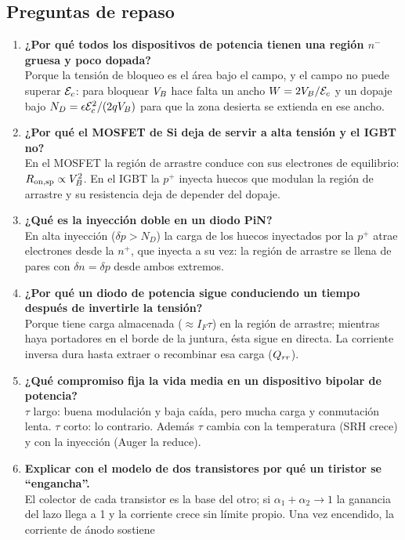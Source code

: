\subsection{Preguntas de repaso}

\begin{enumerate}
  \item \textbf{¿Por qué todos los dispositivos de potencia tienen una región $n^-$ gruesa y poco
  dopada?}\\
  Porque la tensión de bloqueo es el área bajo el campo, y el campo no puede superar $\mathcal{E}_c$: para
  bloquear $V_{B}$ hace falta un ancho $W=2V_{B}/\mathcal{E}_c$ y un dopaje bajo $N_D=\epsilon\mathcal{E}_c^2/(2qV_{B})$ para que
  la zona desierta se extienda en ese ancho.
  \item \textbf{¿Por qué el MOSFET de Si deja de servir a alta tensión y el IGBT no?}\\
  En el MOSFET la región de arrastre conduce con sus electrones de equilibrio: $R_{\mathrm{on,sp}}\propto V_{B}^2$.
  En el IGBT la $p^+$ inyecta huecos que modulan la región de arrastre y su resistencia deja de
  depender del dopaje.
  \item \textbf{¿Qué es la inyección doble en un diodo PiN?}\\
  En alta inyección ($\delta p>N_D$) la carga de los huecos inyectados por la $p^+$ atrae electrones
  desde la $n^+$, que inyecta a su vez: la región de arrastre se llena de pares con $\delta n=\delta p$
  desde ambos extremos.
  \item \textbf{¿Por qué un diodo de potencia sigue conduciendo un tiempo después de invertirle la
  tensión?}\\
  Porque tiene carga almacenada ($\approx I_F\tau$) en la región de arrastre; mientras haya portadores
  en el borde de la juntura, ésta sigue en directa. La corriente inversa dura hasta extraer o
  recombinar esa carga ($Q_{rr}$).
  \item \textbf{¿Qué compromiso fija la vida media en un dispositivo bipolar de potencia?}\\
  $\tau$ largo: buena modulación y baja caída, pero mucha carga y conmutación lenta. $\tau$ corto: lo
  contrario. Además $\tau$ cambia con la temperatura (SRH crece) y con la inyección (Auger la reduce).
  \item \textbf{Explicar con el modelo de dos transistores por qué un tiristor se ``engancha''.}\\
  El colector de cada transistor es la base del otro; si $\alpha_1+\alpha_2\to1$ la ganancia del lazo
  llega a 1 y la corriente crece sin límite propio. Una vez encendido, la corriente de ánodo sostiene

\end{enumerate}
